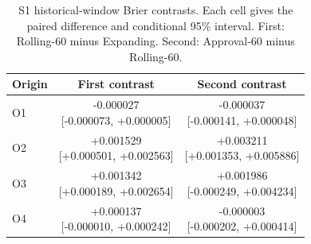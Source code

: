 \begin{table}[t]
\caption{S1 historical-window Brier contrasts. Each cell gives the paired difference and conditional 95\% interval. First: Rolling-60 minus Expanding. Second: Approval-60 minus Rolling-60.}
\label{tab:windows}\centering\scriptsize\setlength{\tabcolsep}{2.5pt}
\begin{tabular}{lcc}\toprule Origin & First contrast & Second contrast\\\midrule
O1 & \shortstack{-0.000027\\{}[-0.000073, +0.000005]} & \shortstack{-0.000037\\{}[-0.000141, +0.000048]} \\
O2 & \shortstack{+0.001529\\{}[+0.000501, +0.002563]} & \shortstack{+0.003211\\{}[+0.001353, +0.005886]} \\
O3 & \shortstack{+0.001342\\{}[+0.000189, +0.002654]} & \shortstack{+0.001986\\{}[-0.000249, +0.004234]} \\
O4 & \shortstack{+0.000137\\{}[-0.000010, +0.000242]} & \shortstack{-0.000003\\{}[-0.000202, +0.000414]} \\
\bottomrule\end{tabular}\end{table}
